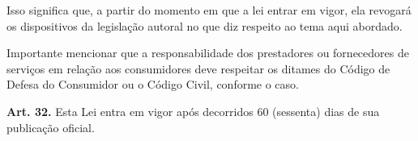 \begin{displayquote}
    Isso significa que, a partir do momento em que a lei entrar em vigor, ela revogará os
    dispositivos da legislação autoral no que diz respeito ao tema aqui abordado.
    
    Importante mencionar que a responsabilidade dos prestadores ou fornecedores de
    serviços em relação aos consumidores deve respeitar os ditames do Código de Defesa
    do Consumidor ou o Código Civil, conforme o caso.
\end{displayquote}

\noindent\textbf{Art. 32.} Esta Lei entra em vigor após decorridos 60 (sessenta) dias de sua publicação oficial.